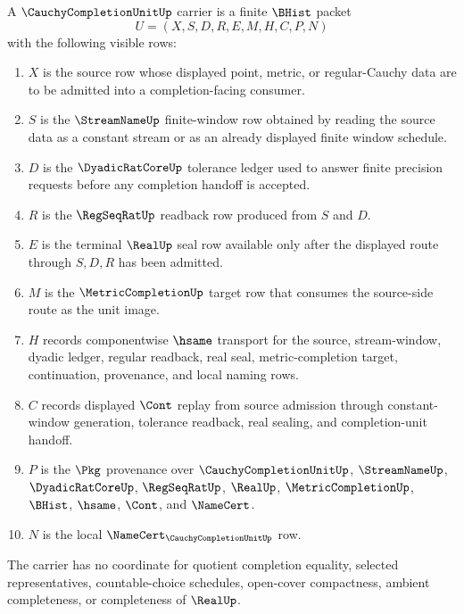 \begin{definition}
\label{def:cauchy-completion-unit-carrier}
A $\CauchyCompletionUnitUp$ carrier is a finite $\BHist$ packet
$$
U=(X,S,D,R,E,M,H,C,P,N)
$$
with the following visible rows:
\begin{enumerate}
\item $X$ is the source row whose displayed point, metric, or regular-Cauchy data are to be admitted into a completion-facing consumer.
\item $S$ is the $\StreamNameUp$ finite-window row obtained by reading the source data as a constant stream or as an already displayed finite window schedule.
\item $D$ is the $\DyadicRatCoreUp$ tolerance ledger used to answer finite precision requests before any completion handoff is accepted.
\item $R$ is the $\RegSeqRatUp$ readback row produced from $S$ and $D$.
\item $E$ is the terminal $\RealUp$ seal row available only after the displayed route through $S,D,R$ has been admitted.
\item $M$ is the $\MetricCompletionUp$ target row that consumes the source-side route as the unit image.
\item $H$ records componentwise $\hsame$ transport for the source, stream-window, dyadic ledger, regular readback, real seal, metric-completion target, continuation, provenance, and local naming rows.
\item $C$ records displayed $\Cont$ replay from source admission through constant-window generation, tolerance readback, real sealing, and completion-unit handoff.
\item $P$ is the $\Pkg$ provenance over $\CauchyCompletionUnitUp$, $\StreamNameUp$, $\DyadicRatCoreUp$, $\RegSeqRatUp$, $\RealUp$, $\MetricCompletionUp$, $\BHist$, $\hsame$, $\Cont$, and $\NameCert$.
\item $N$ is the local $\NameCert_{\CauchyCompletionUnitUp}$ row.
\end{enumerate}
The carrier has no coordinate for quotient completion equality, selected representatives, countable-choice schedules, open-cover compactness, ambient completeness, or completeness of $\RealUp$.
\end{definition}

